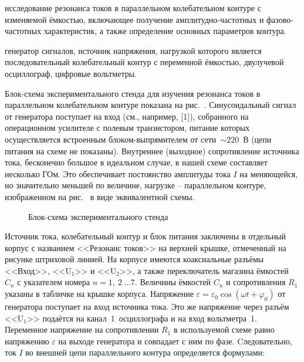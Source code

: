 
\begin{lab:aim}
	исследование резонанса токов в параллельном колебательном контуре с изменяемой ёмкостью, включающее получение амплитудно-частотных и фазово-частотных характеристик, а также определение основных параметров контура.
\end{lab:aim}

\begin{lab:equipment}
	генератор сигналов, источник напряжения, нагрузкой которого является последовательный колебательный контур с переменной ёмкостью, двулучевой осциллограф, цифровые вольтметры.
\end{lab:equipment}

\experiment
Блок-схема экспериментального стенда для изучения резонанса токов в параллельном колебательном контуре показана на рис.~. Синусоидальный сигнал от генератора поступает на вход  (см., например, [1]), собранного на операционном усилителе с полевым транзистором, питание которых осуществляется встроенным блоком-выпрямителем от сети~$\sim220$~В (цепи питания на схеме не показаны).  Внутреннее (выходное) сопротивление источника тока, бесконечно большое в идеальном случае, в нашей схеме составляет несколько ГОм. Это обеспечивает постоянство амплитуды тока $I$ на меняющейся, но значительно меньшей по величине, нагрузке – параллельном контуре, изображенном на рис.~ в виде эквивалентной схемы.

\begin{figure}[h!]
	\caption{Блок-схема экспериментального стенда}
\end{figure}


Источник тока, колебательный контур и блок питания заключены в отдельный корпус с названием <<Резонанс токов>> на верхней крышке, отмеченный на рисунке штриховой линией. На корпусе имеются коаксиальные разъёмы <<Вход>>, <<$\text{U}_1$>> и <<$\text{U}_2$>>, а также переключатель магазина ёмкостей $C_n$ с указателем номера $n=1,~2~\ldots7.$ Величины ёмкостей $C_n$ и сопротивления $R_1$ указаны в табличке на крышке корпуса. Напряжение $\varepsilon=\varepsilon_0\cos(\omega t+\varphi_0)$ от генератора поступает на вход источника тока. Это же напряжение через разъём <<$\text{U}_1$>> подаётся на канал~1~осциллографа и на вход вольтметра~1. Переменное напряжение на сопротивлении $R_1$ в используемой схеме равно напряжению $\varepsilon$ на выходе генератора и совпадает с ним по фазе. Cледовательно, ток $I$ во внешней цепи параллельного контура определяется формулами:

